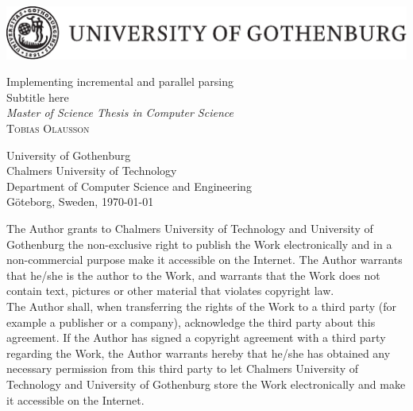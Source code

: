 \begin{titlepage}

\begin{center}
\includegraphics[width=\textwidth]{gulogo.pdf}
\end{center}

\vfill

\begin{flushleft}
{\LARGE Implementing incremental and parallel parsing} \\[0.2cm]
{\Large Subtitle here} \\[0.5cm]
{\large \textit{Master of Science Thesis in Computer Science}}\\[2cm]

{\Huge \textsc{Tobias Olausson}}

\vfill

University of Gothenburg \\
Chalmers University of Technology \\
Department of Computer Science and Engineering \\
Göteborg, Sweden, \monthdate\today
\end{flushleft}

\newpage

\noindent The Author grants to Chalmers University of Technology and University
of Gothenburg  the non-exclusive right to publish the Work electronically and in
a non-commercial purpose make it accessible on the Internet.  The Author
warrants that he/she is the author to the Work, and warrants that the Work does
not contain text, pictures or other material that violates copyright law.\\

\noindent The Author shall, when transferring the rights of the Work to a third
party (for example a publisher or a company), acknowledge the third party about
this agreement. If the Author has signed a copyright agreement with a third
party regarding the Work, the Author warrants hereby that he/she has obtained
any necessary permission from this third party to let Chalmers University of
Technology and University of Gothenburg  store the Work electronically and make
it accessible on the Internet. \\[2cm]


\end{titlepage}
